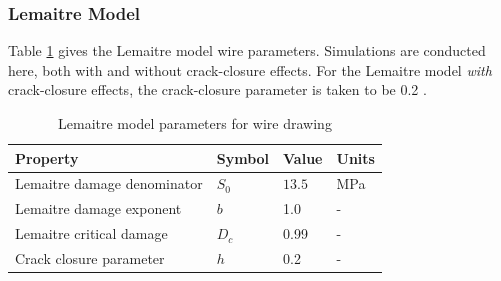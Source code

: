 \documentclass[sn-mathphys,Numbered]{sn-jnl}%
\begin{document}
\subsubsection{Lemaitre Model}
Table \ref{tab:lemaitre_wire_draw_mat} gives the Lemaitre model wire parameters.
Simulations are conducted here, both with and without crack-closure effects.
For the Lemaitre model \emph{with} crack-closure effects, the crack-closure parameter is taken to be 0.2 \cite{desmorat_modeling_2008, lemaitre_course_1996, bouchard_enhanced_2011}.
\begin{table}[htb]
	\centering
		\begin{tabular}{llll} \hline
			Property & Symbol & Value & Units \\ \hline 
			Lemaitre damage denominator & $S_0$ & $13.5$ & MPa  \\
			Lemaitre damage exponent & $b$ & 1.0 & - \\
			Lemaitre critical damage  & $D_c$ & 0.99 & - \\
			Crack closure parameter & $h$ & 0.2 & -\\
			\hline
		\end{tabular}
	\caption{Lemaitre model parameters for wire drawing}
	\label{tab:lemaitre_wire_draw_mat}
\end{table}
\end{document}
